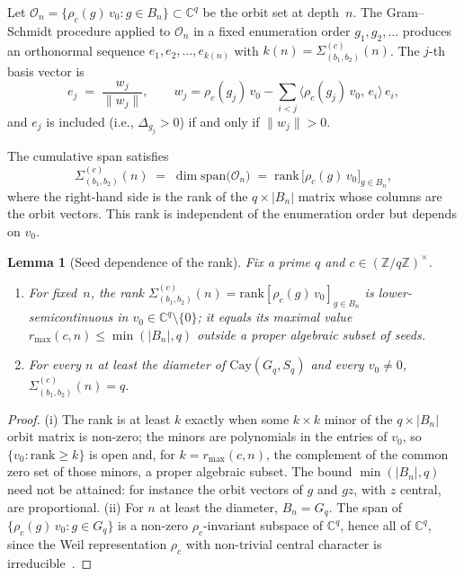 \documentclass[11pt,a4paper]{article}
\newtheorem{lemma}[theorem]{Lemma}
\theoremstyle{remark}
\begin{document}
    Let $\mathcal{O}_{n} = \{\rho_{c}(g)\,v_{0} : g \in B_{n}\} \subset \mathbb{C}^{q}$
    be the orbit set at depth~$n$.
    The Gram--Schmidt procedure applied to $\mathcal{O}_{n}$ in a fixed enumeration order
    $g_{1}, g_{2}, \ldots$ produces an orthonormal sequence
    $e_{1}, e_{2}, \ldots, e_{k(n)}$ with $k(n) = \Sigma^{(c)}_{(b_{1},b_{2})}(n)$.
    The $j$-th basis vector is
    \[
      e_{j}
      \;=\;
      \frac{w_{j}}{\|w_{j}\|},
      \qquad
      w_{j} = \rho_{c}(g_{j})\,v_{0} - \sum_{i < j} \langle \rho_{c}(g_{j})\,v_{0},\, e_{i}\rangle\, e_{i},
    \]
    and $e_{j}$ is included (i.e., $\Delta_{g_{j}} > 0$) if and only if $\|w_{j}\| > 0$.

    The cumulative span satisfies
    \begin{equation}
      \label{eq:Sigma-GS}
      \Sigma^{(c)}_{(b_{1},b_{2})}(n)
      \;=\;
      \dim \mathrm{span}\bigl(\mathcal{O}_{n}\bigr)
      \;=\;
      \mathrm{rank}\,
      \bigl[\rho_{c}(g)\,v_{0}\bigr]_{g \in B_{n}},
    \end{equation}
    where the right-hand side is the rank of the $q \times |B_{n}|$ matrix whose
    columns are the orbit vectors.
    This rank is independent of the enumeration order but depends on $v_{0}$.

    \begin{lemma}[Seed dependence of the rank]
      \label{lem:rank-seed}
      Fix a prime $q$ and $c \in (\mathbb{Z}/q\mathbb{Z})^{\times}$.
      \begin{enumerate}
        \item[(i)] For fixed~$n$, the rank
        $\Sigma^{(c)}_{(b_{1},b_{2})}(n) = \mathrm{rank}[\rho_{c}(g)\,v_{0}]_{g \in B_{n}}$
        is lower-semicontinuous in $v_{0} \in \mathbb{C}^{q} \setminus \{0\}$; it equals its
        maximal value $r_{\max}(c,n) \le \min(|B_{n}|, q)$ outside a proper algebraic subset of
        seeds.
        \item[(ii)] For every $n$ at least the diameter of $\mathrm{Cay}(G_q, S_q)$ and every
        $v_{0} \neq 0$, $\Sigma^{(c)}_{(b_{1},b_{2})}(n) = q$.
      \end{enumerate}
    \end{lemma}

    \begin{proof}
      (i) The rank is at least $k$ exactly when some $k \times k$ minor of the
      $q \times |B_n|$ orbit matrix is non-zero; the minors are polynomials in the entries
      of $v_0$, so $\{v_0 : \mathrm{rank} \ge k\}$ is open and, for $k = r_{\max}(c,n)$,
      the complement of the common zero set of those minors, a proper algebraic subset.
      The bound $\min(|B_n|, q)$ need not be attained: for instance the orbit vectors of
      $g$ and $gz$, with $z$ central, are proportional.
      (ii) For $n$ at least the diameter, $B_n = G_q$.
      The span of $\{\rho_c(g)\,v_0 : g \in G_q\}$ is a non-zero $\rho_c$-invariant subspace of
      $\mathbb{C}^q$, hence all of $\mathbb{C}^q$, since the Weil representation $\rho_c$ with
      non-trivial central character is irreducible~\cite{Beau2026a20}.
    \end{proof}
\end{document}
